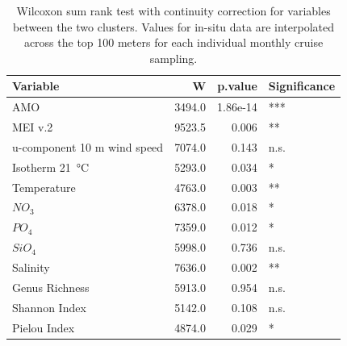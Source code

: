 \documentclass[draft]{agujournal2019}
\begin{document}
\begin{table}
\caption{Wilcoxon sum rank test with continuity correction for variables between the two clusters. Values for in-situ data are interpolated across the top 100 meters for each individual monthly cruise sampling.}
\label{table:clustering}
\centering
\begin{tabular}[t]{lrrl}
\toprule
Variable & W & p.value & Significance\\
\midrule
AMO & 3494.0 & 1.86e-14 & ***\\
MEI v.2 & 9523.5 & 0.006 & **\\
u-component 10 m wind speed & 7074.0 & 0.143 & n.s.\\
Isotherm \qty{21}{\celsius} & 5293.0 & 0.034 & *\\
\addlinespace
Temperature & 4763.0 & 0.003 & **\\
$NO_3$ & 6378.0 & 0.018 & *\\
$PO_4$ & 7359.0 & 0.012 & *\\
$SiO_4$ & 5998.0 & 0.736 & n.s.\\
Salinity & 7636.0 & 0.002 & **\\
\addlinespace
Genus Richness & 5913.0 & 0.954 & n.s.\\
Shannon Index & 5142.0 & 0.108 & n.s.\\
Pielou Index & 4874.0 & 0.029 & *\\
\bottomrule
\end{tabular}
\end{table}
\end{document}
